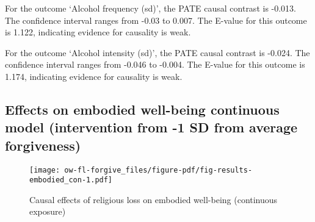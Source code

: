 \documentclass[
  singlecolumn]{report}
\begin{document}
For the outcome `Alcohol frequency (sd)', the PATE causal contrast is
-0.013. The confidence interval ranges from -0.03 to 0.007. The E-value
for this outcome is 1.122, indicating evidence for causality is weak.

For the outcome `Alcohol intensity (sd)', the PATE causal contrast is
-0.024. The confidence interval ranges from -0.046 to -0.004. The
E-value for this outcome is 1.174, indicating evidence for causality is
weak.

\hypertarget{effects-on-embodied-well-being-continuous-model-intervention-from--1-sd-from-average-forgiveness}{%
\subsection{Effects on embodied well-being continuous model
(intervention from -1 SD from average
forgiveness)}\label{effects-on-embodied-well-being-continuous-model-intervention-from--1-sd-from-average-forgiveness}}

\begin{figure}

{\centering \texttt{[image: ow-fl-forgive\_files/figure-pdf/fig-results-embodied\_con-1.pdf]}

}

\caption{\label{fig-results-embodied_con}Causal effects of religious
loss on embodied well-being (continuous exposure)}

\end{figure}
\end{document}
